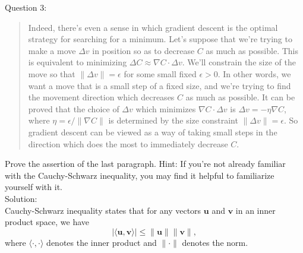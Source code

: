 \documentclass[18pt]{article}
\begin{document}
Question 3: 
\begin{quote}
    Indeed, there's even a sense in which gradient descent is the optimal strategy for searching for a minimum. Let's suppose that we're trying to make a move $\Delta v$ in position so as to decrease $C$ as much as possible. This is equivalent to minimizing $\Delta C \approx \nabla C \cdot \Delta v$. We'll constrain the size of the move so that $\|\Delta v\|=\epsilon$ for some small fixed $\epsilon>0$. In other words, we want a move that is a small step of a fixed size, and we're trying to find the movement direction which decreases $C$ as much as possible. It can be proved that the choice of $\Delta v$ which minimizes $\nabla C \cdot \Delta v$ is $\Delta v=-\eta \nabla C$, where $\eta=\epsilon/\|\nabla C\|$ is determined by the size constraint $\|\Delta v\|=\epsilon$. So gradient descent can be viewed as a way of taking small steps in the direction which does the most to immediately decrease $C$.
\end{quote}
Prove the assertion of the last paragraph. Hint: If you're not already familiar with the Cauchy-Schwarz inequality, you may find it helpful to familiarize yourself with it.\\
Solution: \\
Cauchy-Schwarz inequality states that 
for any vectors $\mathbf{u}$ and $\mathbf{v}$ in an inner product space, we have
\begin{equation}
    \left|\langle \mathbf{u}, \mathbf{v}\rangle \right| \leq \|\mathbf{u}\| \|\mathbf{v}\|,
\end{equation}
where $\langle \cdot, \cdot \rangle$ denotes the inner product and $\|\cdot\|$ denotes the norm.
\end{document}
